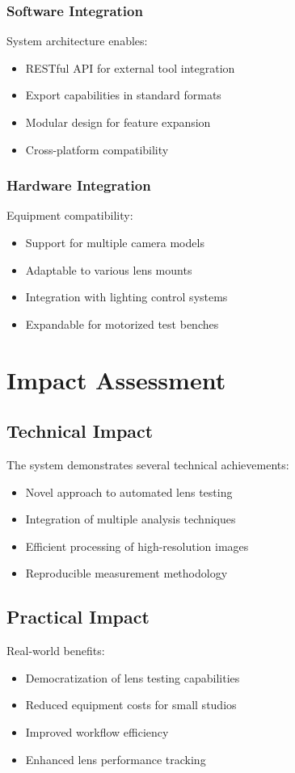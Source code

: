 \subsubsection{Software Integration}
System architecture enables:
\begin{itemize}
    \item RESTful API for external tool integration
    \item Export capabilities in standard formats
    \item Modular design for feature expansion
    \item Cross-platform compatibility
\end{itemize}

\subsubsection{Hardware Integration}
Equipment compatibility:
\begin{itemize}
    \item Support for multiple camera models
    \item Adaptable to various lens mounts
    \item Integration with lighting control systems
    \item Expandable for motorized test benches
\end{itemize}

\section{Impact Assessment}

\subsection{Technical Impact}
The system demonstrates several technical achievements:
\begin{itemize}
    \item Novel approach to automated lens testing
    \item Integration of multiple analysis techniques
    \item Efficient processing of high-resolution images
    \item Reproducible measurement methodology
\end{itemize}

\subsection{Practical Impact}
Real-world benefits:
\begin{itemize}
    \item Democratization of lens testing capabilities
    \item Reduced equipment costs for small studios
    \item Improved workflow efficiency
    \item Enhanced lens performance tracking
\end{itemize}

